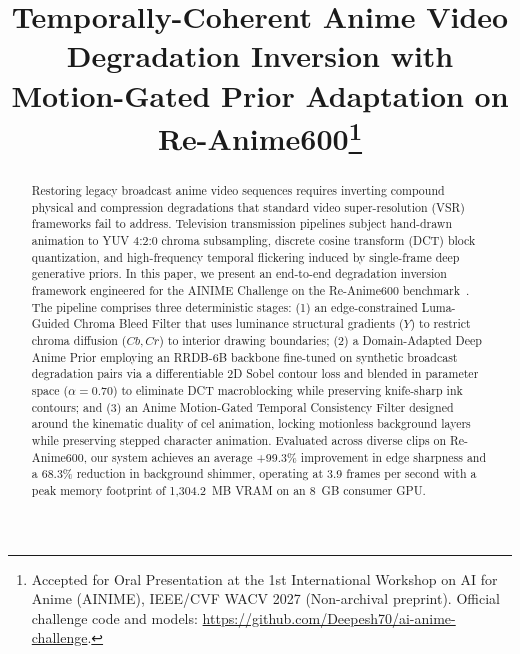 \documentclass[conference]{IEEEtran}
\begin{document}
\title{Temporally-Coherent Anime Video Degradation Inversion with Motion-Gated Prior Adaptation on Re-Anime600\thanks{Accepted for Oral Presentation at the 1st International Workshop on AI for Anime (AINIME), IEEE/CVF WACV 2027 (Non-archival preprint). Official challenge code and models: \url{https://github.com/Deepesh70/ai-anime-challenge}.}}

\author{
\and
{}
}

\maketitle

\begin{abstract}
Restoring legacy broadcast anime video sequences requires inverting compound physical and compression degradations that standard video super-resolution (VSR) frameworks fail to address. Television transmission pipelines subject hand-drawn animation to YUV 4:2:0 chroma subsampling, discrete cosine transform (DCT) block quantization, and high-frequency temporal flickering induced by single-frame deep generative priors. In this paper, we present an end-to-end degradation inversion framework engineered for the AINIME Challenge on the Re-Anime600 benchmark~\cite{fargetta2026re}. The pipeline comprises three deterministic stages: (1) an edge-constrained Luma-Guided Chroma Bleed Filter that uses luminance structural gradients ($Y$) to restrict chroma diffusion ($Cb, Cr$) to interior drawing boundaries; (2) a Domain-Adapted Deep Anime Prior employing an RRDB-6B backbone fine-tuned on synthetic broadcast degradation pairs via a differentiable 2D Sobel contour loss and blended in parameter space ($\alpha = 0.70$) to eliminate DCT macroblocking while preserving knife-sharp ink contours; and (3) an Anime Motion-Gated Temporal Consistency Filter designed around the kinematic duality of cel animation, locking motionless background layers while preserving stepped character animation. Evaluated across diverse clips on Re-Anime600, our system achieves an average +99.3\% improvement in edge sharpness and a 68.3\% reduction in background shimmer, operating at 3.9 frames per second with a peak memory footprint of 1,304.2~MB VRAM on an 8~GB consumer GPU.
\end{abstract}
\end{document}
